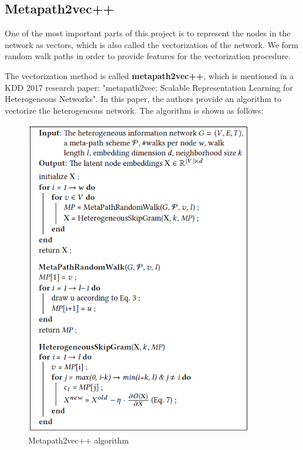 \documentclass{acmtog} %
\begin{document}
\subsection{Metapath2vec++}
One of the most important parts of this project is to represent the nodes in the network as vectors, which is also called the vectorization of the network. We form random walk paths in order to provide features for the vectorization procedure.
\par The vectorization method is called \textbf{metapath2vec++}\cite{meta}, which is mentioned in a KDD 2017 research paper: "metapath2vec: Scalable Representation Learning for Heterogeneous Networks". In this paper, the authors provide an algorithm to vectorize the heterogeneous network. The algorithm is shown as follows:
\begin{figure}[H]
  \centering
  \includegraphics[width=1.0\linewidth]{alg.png}
  \caption{Metapath2vec++ algorithm}
  \label{4}
\end{figure}
\end{document}
